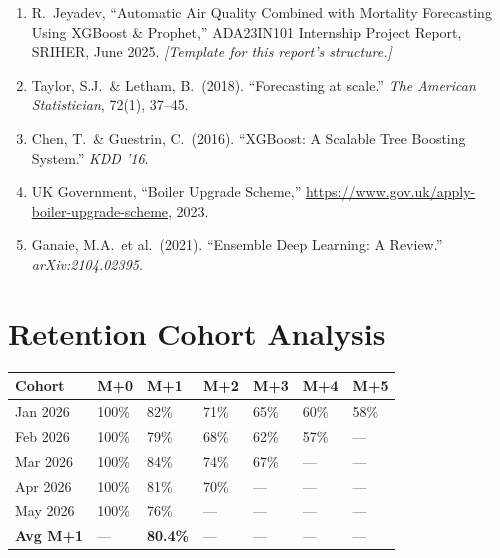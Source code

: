 \documentclass[12pt,a4paper]{report}
\begin{document}
\begin{enumerate}[noitemsep]
  \item R.\ Jeyadev, ``Automatic Air Quality Combined with Mortality Forecasting Using XGBoost \& Prophet,'' ADA23IN101 Internship Project Report, SRIHER, June 2025. \textit{[Template for this report's structure.]}
  \item Taylor, S.J.\ \& Letham, B.\ (2018). ``Forecasting at scale.'' \textit{The American Statistician}, 72(1), 37--45.
  \item Chen, T.\ \& Guestrin, C.\ (2016). ``XGBoost: A Scalable Tree Boosting System.'' \textit{KDD '16}.
  \item UK Government, ``Boiler Upgrade Scheme,'' \url{https://www.gov.uk/apply-boiler-upgrade-scheme}, 2023.
  \item Ganaie, M.A.\ et al.\ (2021). ``Ensemble Deep Learning: A Review.'' \textit{arXiv:2104.02395}.
\end{enumerate}

\clearpage
\appendix
\chapter{Retention Cohort Analysis}

\vspace{4pt}
\begin{center}
\begin{tabular}{L{2.5cm} C{1.4cm} C{1.4cm} C{1.4cm} C{1.4cm} C{1.4cm} C{1.4cm}}
\toprule
{}
\color{white}\textbf{Cohort} &
\color{white}\textbf{M+0} &
\color{white}\textbf{M+1} &
\color{white}\textbf{M+2} &
\color{white}\textbf{M+3} &
\color{white}\textbf{M+4} &
\color{white}\textbf{M+5} \\
\midrule
{} Jan 2026 & 100\% & 82\% & 71\% & 65\% & 60\% & 58\% \\
 Feb 2026 & 100\% & 79\% & 68\% & 62\% & 57\% & --- \\
 Mar 2026 & 100\% & 84\% & 74\% & 67\% & --- & --- \\
 Apr 2026 & 100\% & 81\% & 70\% & --- & --- & --- \\
 May 2026 & 100\% & 76\% & --- & --- & --- & --- \\
\midrule
{}
\textbf{Avg M+1} & --- & \textbf{80.4\%} & --- & --- & --- & --- \\
\bottomrule
\end{tabular}
\end{center}
\end{document}
